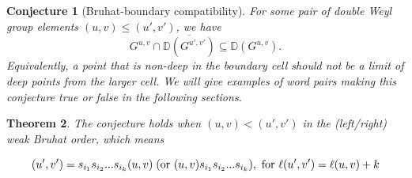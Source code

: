 \documentclass[12pt]{amsart}
\newcommand{\D}{\mathbb D}
\newcommand{\ol}{\overline}
\theoremstyle{plain}
\newtheorem{theorem}{Theorem}[section]
\newtheorem{conjecture}[theorem]{Conjecture}
\theoremstyle{definition}
\theoremstyle{remark}
\begin{document}
\begin{conjecture}[Bruhat-boundary compatibility]\label{conj:boundary}
For some pair of double Weyl group elements $(u,v)\leq(u',v')$, we have
\[
   G^{u,v}\cap \ol{\D(G^{u',v'})}
   \subseteq
   \D(G^{u,v}).
\]
Equivalently, a point that is non-deep in the boundary cell should not be a limit of deep points from the larger cell. We will give examples of word pairs making this conjecture true or false in the following sections.
\end{conjecture}

\begin{theorem}
The conjecture holds when $(u,v)<(u',v')$ in the \emph{(left/right) weak Bruhat order}, which means

$$(u',v')=s_{i_1}s_{i_2}...s_{i_k}(u,v)\;\textup{(or }(u,v)s_{i_1}s_{i_2}...s_{i_k}\textup{)}, \textup{ for } \ell(u',v')=\ell(u,v)+k$$
\end{theorem}
\end{document}

